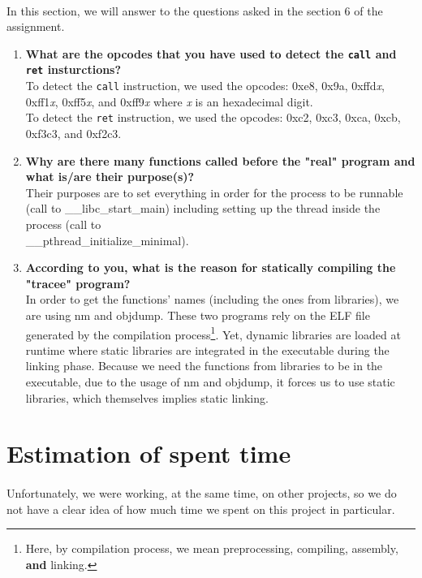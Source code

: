 \documentclass[a4paper, 11pt, oneside]{article}
\begin{document}
\paragraph{}In this section, we will answer to the questions asked in the section 6 of the assignment.
\begin{enumerate}
	\item \textbf{What are the opcodes that you have used to detect the \texttt{call} and \texttt{ret} insturctions?}\\
	To detect the \texttt{call} instruction, we used the opcodes: 0xe8, 0x9a, 0xffd\textit{x}, 0xff1\textit{x}, 0xff5\textit{x}, and 0xff9\textit{x} where \textit{x} is an hexadecimal digit.\\
	To detect the \texttt{ret} instruction, we used the opcodes: 0xc2, 0xc3, 0xca, 0xcb, 0xf3c3, and 0xf2c3.
	\item \textbf{Why are there many functions called before the "real" program and what is/are their purpose(s)?}\\
	Their purposes are to set everything in order for the process to be runnable (call to \_\_libc\_start\_main) including setting up the thread inside the process (call to\\\_\_pthread\_initialize\_minimal).
	\item \textbf{According to you, what is the reason for statically compiling the "tracee" program?}\\
	In order to get the functions' names (including the ones from libraries), we are using nm and objdump. These two programs rely on the ELF file generated by the compilation process\footnote{Here, by compilation process, we mean preprocessing, compiling, assembly, \textbf{and} linking.}. Yet, dynamic libraries are loaded at runtime where static libraries are integrated in the executable during the linking phase. Because we need the functions from libraries to be in the executable, due to the usage of nm and objdump, it forces us to use static libraries, which themselves implies static linking.
\end{enumerate}

\section{Estimation of spent time}
\paragraph{}Unfortunately, we were working, at the same time, on other projects, so we do not have a clear idea of how much time we spent on this project in particular.
\end{document}
